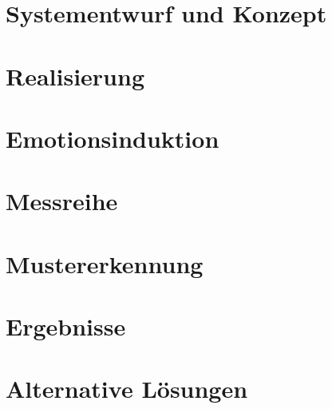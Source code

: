 

\section{Systementwurf und Konzept} \label{systementwurf-4}



\newpage
\section{Realisierung} \label{realisierung-4}



\newpage
\section{Emotionsinduktion} \label{emotionsinduktion-4}



\newpage
\section{Messreihe} \label{messreihe-4}



\newpage
\section{Mustererkennung} \label{mustererkennung-4}


\newpage
\section{Ergebnisse} \label{ergenisse-4}


\newpage
\section{Alternative L{\"o}sungen} \label{alternativen-4}

